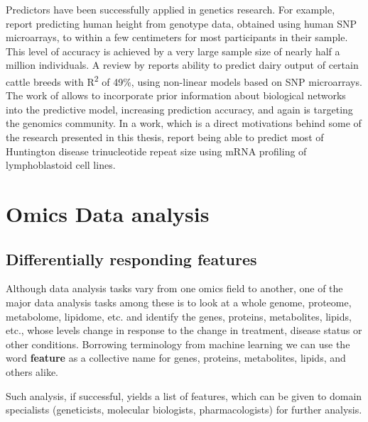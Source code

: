 Predictors have been successfully applied in genetics research. For example, \textcite{Lello2017} report predicting human height from genotype data, obtained using human SNP microarrays, to within a few centimeters for most participants in their sample. This level of accuracy is achieved by a very large sample size of nearly half a million individuals. A review by \textcite{VanRaden2009} reports ability to predict dairy output of certain cattle breeds with R\textsuperscript{2} of 49\%, using non-linear models based on SNP microarrays. The work of \textcite{Azencott2013} allows to incorporate prior information about biological networks into the predictive model, increasing prediction accuracy, and again is targeting the genomics community. In a work, which is a direct motivations behind some of the research presented in this thesis, \textcite{Lee2013} report being able to predict most of Huntington disease trinucleotide repeat size using mRNA profiling of lymphoblastoid cell lines.

\section{Omics Data analysis}

\subsection{Differentially responding features}

Although data analysis tasks vary from one omics field to another, one of the major data analysis tasks among these is to look at a whole genome, proteome, metabolome, lipidome, etc. and identify the genes, proteins, metabolites, lipids, etc., whose levels change in response to the change in treatment, disease status or other conditions. Borrowing terminology from machine learning we can use the word \textbf{feature} as a collective name for genes, proteins, metabolites, lipids, and others alike.

Such analysis, if successful, yields a list of features, which can be given to domain specialists (geneticists, molecular biologists, pharmacologists) for further analysis.

